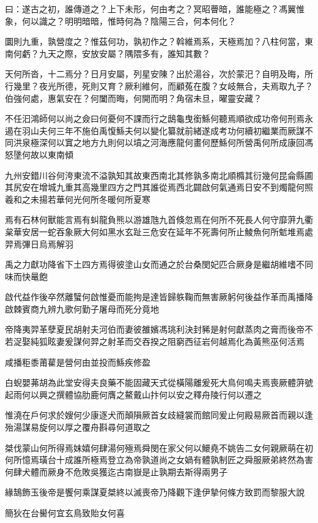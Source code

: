 
\begin{pinyinscope}
曰：遂古之初，誰傳道之？上下未形，何由考之？冥昭瞢暗，誰能極之？馮翼惟象，何以識之？明明暗暗，惟時何為？陰陽三合，何本何化？

圜則九重，孰營度之？惟茲何功，孰初作之？斡維焉系，天極焉加？八柱何當，東南何虧？九天之際，安放安屬？隅隈多有，誰知其數？

天何所沓，十二焉分？日月安屬，列星安陳？出於湯谷，次於蒙汜？自明及晦，所行幾里？夜光所德，死則又育？厥利維何，而顧菟在腹？女岐無合，夫焉取九子？伯強何處，惠氣安在？何闔而晦，何開而明？角宿未旦，曜靈安藏？

不任汩鴻師何以尚之僉曰何憂何不課而行之鴟龜曳銜鯀何聽焉順欲成功帝何刑焉永遏在羽山夫何三年不施伯禹愎鯀夫何以變化纂就前緒遂成考功何續初繼業而厥謀不同洪泉極深何以窴之地方九則何以墳之河海應龍何畫何歷鯀何所營禹何所成康回馮怒墬何故以東南傾

九州安錯川谷何洿東流不溢孰知其故東西南北其修孰多南北順橢其衍幾何昆侖縣圃其尻安在增城九重其高幾里四方之門其誰從焉西北闢啟何氣通焉日安不到燭龍何照羲和之未揚若華何光何所冬暖何所夏寒

焉有石林何獸能言焉有虯龍負熊以游雄虺九首倏忽焉在何所不死長人何守靡蓱九衢枲華安居一蛇吞象厥大何如黑水玄趾三危安在延年不死壽何所止鯪魚何所鬿堆焉處羿焉彃日烏焉解羽

禹之力獻功降省下土四方焉得彼塗山女而通之於台桑閔妃匹合厥身是繼胡維嗜不同味而快鼌飽

啟代益作後卒然離蠥何啟惟憂而能拘是達皆歸䠶鞠而無害厥躬何後益作革而禹播降啟棘賓商九辨九歌何勤子屠母而死分竟地

帝降夷羿革孽夏民胡射夫河伯而妻彼雒嬪馮珧利決封豨是射何獻蒸肉之膏而後帝不若浞娶純狐眩妻爰謀何羿之射革而交吞揆之阻窮西征岩何越焉化為黃熊巫何活焉

咸播秬黍莆雚是營何由並投而鯀疾修盈

白蜺嬰茀胡為此堂安得夫良藥不能固藏天式從橫陽離爰死大鳥何鳴夫焉喪厥體蓱號起雨何以興之撰體協肋鹿何膺之鰲戴山抃何以安之釋舟陵行何以遷之

惟澆在戶何求於嫂何少康逐犬而顛隕厥首女歧縫裳而館同爰止何殿易厥首而親以逢殆湯謀易旋何以厚之覆舟斟尋何道取之

桀伐蒙山何所得焉妺嬉何肆湯何殛焉舜閔在家父何以鱞堯不姚告二女何親厥萌在初何所憶焉璜台十成誰所極焉登立為帝孰道尚之女媧有體孰制匠之舜服厥弟終然為害何肆犬體而厥身不危敗吳獲迄古南嶽是止孰期去斯得兩男子

緣鵠飾玉後帝是饗何乘謀夏桀終以滅喪帝乃降觀下逢伊摯何條方致罰而黎服大說

簡狄在台嚳何宜玄鳥致貽女何喜


\end{pinyinscope}
